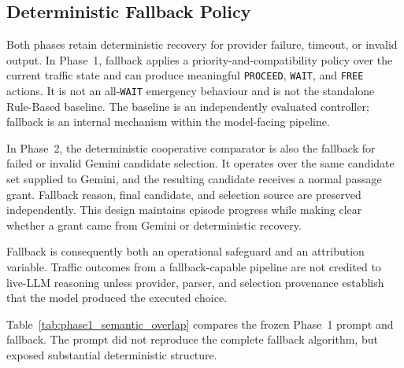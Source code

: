 \documentclass[letterpaper,10pt,conference]{ieeeconf}
\begin{document}
\subsection{Deterministic Fallback Policy}



Both phases retain deterministic recovery for provider failure, timeout, or invalid output. In Phase~1, fallback applies a priority-and-compatibility policy over the current traffic state and can produce meaningful \texttt{PROCEED}, \texttt{WAIT}, and \texttt{FREE} actions. It is not an all-\texttt{WAIT} emergency behaviour and is not the standalone Rule-Based baseline. The baseline is an independently evaluated controller; fallback is an internal mechanism within the model-facing pipeline.



In Phase~2, the deterministic cooperative comparator is also the fallback for failed or invalid Gemini candidate selection. It operates over the same candidate set supplied to Gemini, and the resulting candidate receives a normal passage grant. Fallback reason, final candidate, and selection source are preserved independently. This design maintains episode progress while making clear whether a grant came from Gemini or deterministic recovery.



Fallback is consequently both an operational safeguard and an attribution variable. Traffic outcomes from a fallback-capable pipeline are not credited to live-LLM reasoning unless provider, parser, and selection provenance establish that the model produced the executed choice.



Table~\ref{tab:phase1_semantic_overlap} compares the frozen Phase~1 prompt and fallback. The prompt did not reproduce the complete fallback algorithm, but exposed substantial deterministic structure.
\end{document}
